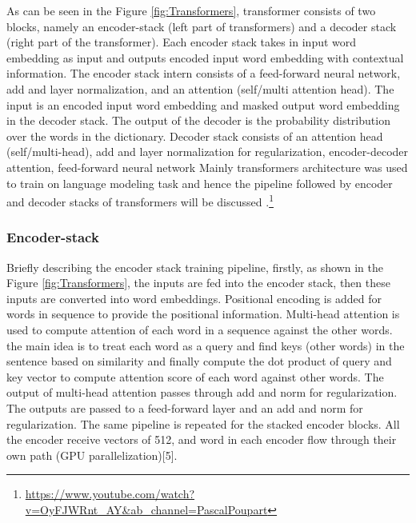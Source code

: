 As can be seen in the Figure \ref{fig:Transformers}, transformer consists of two blocks, namely an encoder-stack (left part of transformers) and a decoder stack (right part of the transformer). Each encoder stack takes in input word embedding as input and outputs encoded input word embedding with contextual information. The encoder stack intern consists of a feed-forward neural network, add and layer normalization, and an attention (self/multi attention head). The input is an encoded input word embedding and masked output word embedding in the decoder stack. The output of the decoder is the probability distribution over the words in the dictionary. Decoder stack consists of  an attention head (self/multi-head), add and layer normalization for regularization, encoder-decoder attention, feed-forward neural network Mainly transformers architecture was used to train on language modeling task and hence the pipeline followed by encoder and decoder stacks of transformers will be discussed .\footnote{\url{https://www.youtube.com/watch?v=OyFJWRnt_AY&ab_channel=PascalPoupart}} \cite{vaswani2017attention}

\subsubsection{Encoder-stack}
Briefly describing the encoder stack training pipeline, firstly, as shown in the Figure \ref{fig:Transformers}, the inputs are fed into the encoder stack, then these inputs are converted into word embeddings. Positional encoding is added for words in sequence to provide the positional information. Multi-head attention is used to compute attention of each word in a sequence against the other words. the main idea is to treat each word as a query and find keys (other words) in the sentence based on similarity and finally compute the dot product of query and key vector to compute attention score of each word against other words. The output of multi-head attention passes through add and norm for regularization. The outputs are passed to a feed-forward layer and an add and norm for regularization. The same pipeline is repeated for the stacked encoder blocks. All the encoder receive vectors of 512, and word in each encoder flow through their own path (GPU parallelization)[5]\cite{vaswani2017attention}.

